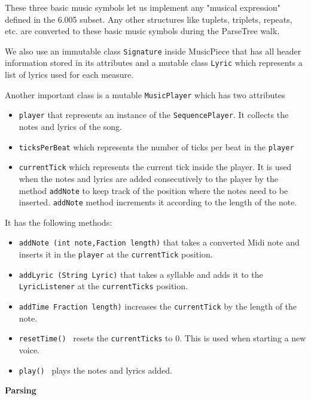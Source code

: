 \documentclass[12pt]{book}
\begin{document}
These three basic music symbols let us implement any "musical expression" defined in the 6.005 subset. Any other structures like tuplets, triplets, repeats, etc. are converted to these basic music symbols during the ParseTree walk.  

We also use an immutable class {\tt Signature} inside MusicPiece that has all header information stored in its attributes and a mutable class {\tt Lyric} which represents a list of lyrics used for each measure.

\bigskip
Another important class is a mutable {\tt MusicPlayer} which has two attributes 
\begin{itemize} 
\item { \tt player} that represents an instance of the {\tt SequencePlayer}. It collects the notes and lyrics of the song.
\item { \tt ticksPerBeat} which represents the number of ticks per beat in the {\tt player}
\item { \tt currentTick} which represents the current tick inside the player. It is used when the notes and lyrics are added consecutively to the player by the method {\tt addNote} to keep track of the position  where the notes need to be inserted. {\tt addNote} method increments it according to the length of the note.
\end{itemize}
It has the following methods:
\begin{itemize} 
\item { \tt addNote (int note,Faction length)} that takes a converted Midi note and inserts it in the {\tt player} at the {\tt currentTick} position.
\item { \tt addLyric (String Lyric)} that takes a syllable and adds it to the {\tt LyricListener} at the {\tt currentTicks} position.
\item { \tt addTime Fraction length)} increases the {\tt currentTick} by the length of the note.
\item { \tt resetTime() } resets the {\tt currentTicks} to 0. This is used when starting a new voice.
\item { \tt play() } plays the notes and lyrics added.
\end{itemize}


\centerline{{\large \bf Parsing }}
\end{document}
